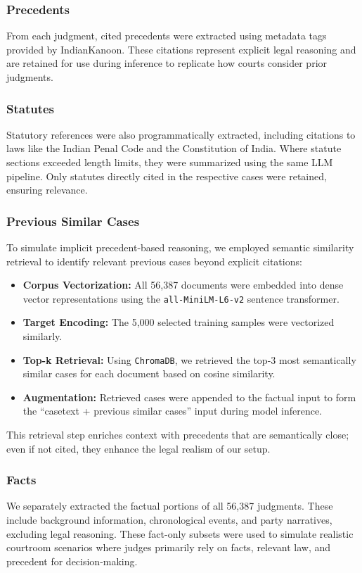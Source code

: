 \subsubsection{Precedents}

From each judgment, cited precedents were extracted using metadata tags provided by IndianKanoon. These citations represent explicit legal reasoning and are retained for use during inference to replicate how courts consider prior judgments.

\subsubsection{Statutes}

Statutory references were also programmatically extracted, including citations to laws like the Indian Penal Code and the Constitution of India. Where statute sections exceeded length limits, they were summarized using the same LLM pipeline. Only statutes directly cited in the respective cases were retained, ensuring relevance.

\subsubsection{Previous Similar Cases}
To simulate implicit precedent-based reasoning, we employed semantic similarity retrieval to identify relevant previous cases beyond explicit citations:

\begin{itemize}
    \item \textbf{Corpus Vectorization:} All 56,387 documents were embedded into dense vector representations using the \texttt{all-MiniLM-L6-v2} sentence transformer.
    \item \textbf{Target Encoding:} The 5,000 selected training samples were vectorized similarly.
    \item \textbf{Top-k Retrieval:} Using \texttt{ChromaDB}, we retrieved the top-3 most semantically similar cases for each document based on cosine similarity.
    \item \textbf{Augmentation:} Retrieved cases were appended to the factual input to form the ``casetext + previous similar cases'' input during model inference.
\end{itemize}

This retrieval step enriches context with precedents that are semantically close; even if not cited, they enhance the legal realism of our setup.

\subsubsection{Facts}
We separately extracted the factual portions of all 56,387 judgments. These include background information, chronological events, and party narratives, excluding legal reasoning. These fact-only subsets were used to simulate realistic courtroom scenarios where judges primarily rely on facts, relevant law, and precedent for decision-making.

